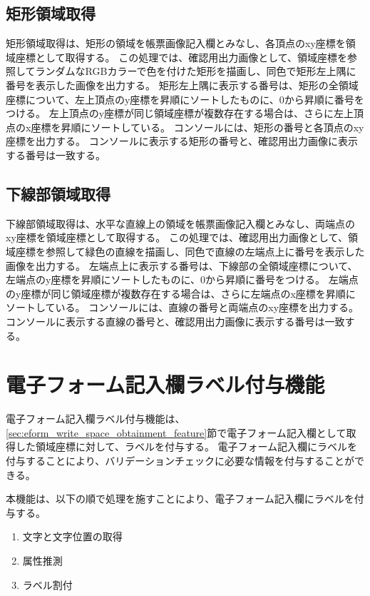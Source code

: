 \subsection{矩形領域取得}\label{subsec:rect_coords_obtainment}
矩形領域取得は、矩形の領域を帳票画像記入欄とみなし、各頂点のxy座標を領域座標として取得する。
この処理では、確認用出力画像として、領域座標を参照してランダムなRGBカラーで色を付けた矩形を描画し、同色で矩形左上隅に番号を表示した画像を出力する。
矩形左上隅に表示する番号は、矩形の全領域座標について、左上頂点のy座標を昇順にソートしたものに、0から昇順に番号をつける。
左上頂点のy座標が同じ領域座標が複数存在する場合は、さらに左上頂点のx座標を昇順にソートしている。
コンソールには、矩形の番号と各頂点のxy座標を出力する。
コンソールに表示する矩形の番号と、確認用出力画像に表示する番号は一致する。



\subsection{下線部領域取得}\label{subsec:underline_coords_obtainment}
下線部領域取得は、水平な直線上の領域を帳票画像記入欄とみなし、両端点のxy座標を領域座標として取得する。
この処理では、確認用出力画像として、領域座標を参照して緑色の直線を描画し、同色で直線の左端点上に番号を表示した画像を出力する。
左端点上に表示する番号は、下線部の全領域座標について、左端点のy座標を昇順にソートしたものに、0から昇順に番号をつける。
左端点のy座標が同じ領域座標が複数存在する場合は、さらに左端点のx座標を昇順にソートしている。
コンソールには、直線の番号と両端点のxy座標を出力する。
コンソールに表示する直線の番号と、確認用出力画像に表示する番号は一致する。


\section{電子フォーム記入欄ラベル付与機能}\label{sec:label_link}
電子フォーム記入欄ラベル付与機能は、\ref{sec:eform_write_space_obtainment_feature}節で電子フォーム記入欄として取得した領域座標に対して、ラベルを付与する。
電子フォーム記入欄にラベルを付与することにより、バリデーションチェックに必要な情報を付与することができる。

本機能は、以下の順で処理を施すことにより、電子フォーム記入欄にラベルを付与する。

\begin{enumerate}
  \item 文字と文字位置の取得
  \item 属性推測
  \item ラベル割付
\end{enumerate}

